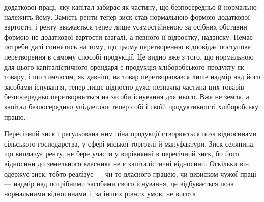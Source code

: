 додаткової праці, яку капітал забирає як частину, що безпосередньо й нормально
належить йому. Замість ренти тепер зиск став нормальною формою додаткової
вартости, і ренту вважається тепер лише усамостійненою за осібних
обставин формою не додаткової вартости взагалі, а певного її відростку, надзиску.
Немає потреби далі спинятись на тому, що цьому перетворенню відповідає
поступове перетворення в самому способі продукції. Це видно вже з того,
що нормальною для цього капіталістичного орендаря є продукція хліборобського
продукту як товару, і що тимчасом, як давніш, на товар перетворювався лише
надмір над його засобами існування, тепер лише відносно дуже незначна частина
цих товарів безпосередньо перетворюється на засоби існування для нього.
Вже не земля, а капітал безпосередньо упідлеглює тепер собі і своїй продуктивності
хліборобську працю.

Пересічний зиск і регульована ним ціна продукції створюється поза відносинами
сільського господарства, у сфері міської торговлі й мануфактури. Зиск
селянина, що виплачує ренту, не бере участи у вирівнянні в пересічний зиск,
бо його відносини до земельного власника не є капіталістичні відносини.
Оскільки він одержує зиск, тобто реалізує — чи то власного працею, чи визиском
чужої праці — надмір над потрібними засобами свого існування, це відбувається
поза нормальними відносинами і, за інших рівних умов, не висота
\parbreak{}  %
